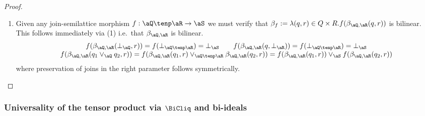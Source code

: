 \documentclass{article}
\begin{document}
\begin{proof}
\begin{enumerate}
\item
Given any join-semilattice morphism $f : \aQ \tenp \aR \to \aS$ we must verify that $\beta_f := \lambda (q,r) \in Q \times R. f(\beta_{\aQ,\aR}(q,r))$ is bilinear. This follows immediately via (1) i.e.\ that $\beta_{\aQ,\aR}$ is bilinear. 
\[
\begin{tabular}{c}
$f(\beta_{\aQ,\aR}(\bot_\aQ,r))
= f(\bot_{\aQ \tenp \aR})
= \bot_\aS
\qquad
f(\beta_{\aQ,\aR}(q,\bot_\aR))
= f(\bot_{\aQ \tenp \aR})
= \bot_\aS$
\\
$f(\beta_{\aQ,\aR}(q_1 \lor_\aQ q_2,r))
= f(\beta_{\aQ,\aR}(q_1,r) \lor_{\aQ \tenp \aR} \beta_{\aQ,\aR}(q_2,r))
= f(\beta_{\aQ,\aR}(q_1,r)) \lor_\aS f(\beta_{\aQ,\aR}(q_2,r))
$
\end{tabular}
\]
where preservation of joins in the right parameter follows symmetrically.

\end{enumerate}
\end{proof}



\subsubsection{Universality of the tensor product via $\BiCliq$ and bi-ideals}
\end{document}
